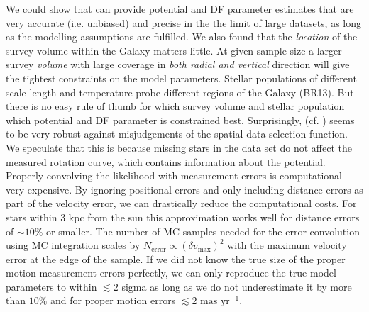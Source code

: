  We could show that \RM{} can provide potential and DF parameter estimates that are very accurate (i.e. unbiased) and precise in the the limit of large datasets, as long as the modelling assumptions are fulfilled. We also found that the \emph{location} of the survey volume within the Galaxy matters little. At given sample size a larger survey \emph{volume} with large coverage in \emph{both radial and vertical} direction will give the tightest constraints on the model parameters. Stellar populations of different scale length and temperature probe different regions of the Galaxy (BR13). But there is no easy rule of thumb for which survey volume and stellar population which potential and DF parameter is constrained best. Surprisingly, (cf. \citealt{2013A&ARv..21...61R}) \RM{} seems to be very robust against misjudgements of the spatial data selection function. We speculate that this is because missing stars in the data set do not affect the measured rotation curve, which contains information about the potential.  Properly convolving the likelihood with measurement errors is computational very expensive. By ignoring positional errors and only including distance errors as part of the velocity error, we can drastically reduce the computational costs. For stars within 3 kpc from the sun this approximation works well for distance errors of $\sim 10\%$ or smaller. The number of MC samples needed for the error convolution using MC integration scales by $N_\text{error} \propto (\delta v_\text{max})^2$ with the maximum velocity error at the edge of the sample. If we did not know the true size of the proper motion measurement errors perfectly, we can only reproduce the true model parameters to within $\lesssim 2$ sigma \Wilma{[TO DO: Check???]} as long as we do not underestimate it by more than $10\%$ and for proper motion errors $\lesssim 2 \text{ mas yr}^{-1}$.\\


